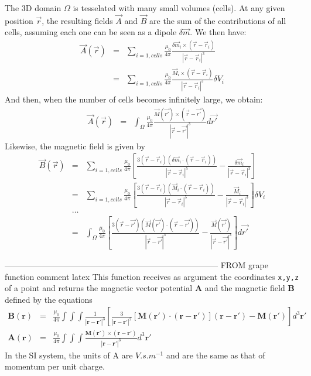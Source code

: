 The 3D domain $\Omega$ is tesselated with many small volumes (cells).
At any given position $\vec r$, the resulting fields $\vec A$ and $\vec B$
are the sum of the contributions of all cells, assuming each one
can be seen as a dipole $\delta \vec m$.
We then have:
\begin{eqnarray}
\vec A(\vec r) 
&=&  \sum_{i=1,cells} \frac{\mu_0}{4 \pi} \frac{ \delta \vec m_i \times (\vec r- \vec r_{i})}{|\vec r-\vec r_{i}|^3} \\
&=&  \sum_{i=1,cells} \frac{\mu_0}{4 \pi} \frac{ \vec M_i \times (\vec r- \vec r_{i})}{|\vec r-\vec r_{i}|^3} \delta V_i 
\end{eqnarray}
And then, when the number of cells becomes infinitely large, we obtain:
\begin{eqnarray}
\vec A(\vec r) 
&=&  \int_\Omega \frac{\mu_0}{4 \pi} \frac{ \vec M(\vec {r'}) \times (\vec r- \vec {r'})}{|\vec r-\vec{r'}|^3} d\vec{r'} 
\end{eqnarray}
Likewise, the magnetic field is given by 
\begin{eqnarray}
\vec B (\vec r) 
&=& \sum_{i=1,cells} \frac{\mu_0}{4\pi} 
\left[  \frac{3 (\vec r-\vec r_i) (\delta \vec m_i \cdot (\vec r-\vec r_i))}{|\vec r -\vec{r}_i|^5} - \frac{\delta \vec m_i}{|\vec r -\vec{r}_i|^3}  \right] \\
&=& \sum_{i=1,cells} \frac{\mu_0}{4\pi} 
\left[  \frac{3 (\vec r-\vec r_i) (\vec M_i \cdot (\vec r-\vec r_i))}{|\vec r -\vec{r}_i|^5} - \frac{\vec M_i}{|\vec r -\vec{r}_i|^3}  \right] \delta V_i \\
&\dots& \nonumber\\
&=& \int_\Omega \frac{\mu_0}{4\pi} 
\left[ \frac{3 (\vec r-\vec {r'}) (\vec M(\vec {r'}) \cdot (\vec r-\vec{r'}))}{|\vec r -\vec{r'}|^5} - \frac{\vec M(\vec{r'})}{|\vec r -\vec{r'}|^3} \right] d\vec{r'} 
\end{eqnarray}






------------------------------------------------------------------------------
FROM grape function comment latex
This function receives as argument the coordinates {\tt x,y,z} of a point and 
returns the magnetic vector potential ${\bm A}$ and the magnetic field ${\bm B}$
defined by the equations
\begin{eqnarray}
{\bm B}({\bm r}) &=& \frac{\mu_0}{4\pi} \int\int\int \frac{1}{|{\bm r}-{\bm r}'|^3}
\left[
\frac{3}{|{\bm r}-{\bm r}'|^2} [{\bm M}({\bm r}')\cdot({\bm r}-{\bm r}')]({\bm r}-{\bm r}') - {\bm M}({\bm r}')
\right]
d^3{\bm r}' \\
{\bm A}({\bm r}) &=& 
\frac{\mu_0}{4\pi} \int\int\int \frac{{\bm M}({\bm r}') \times ({\bm r}-{\bm r}')}{|{\bm r}-{\bm r}'|^3}
d^3{\bm r}'
\end{eqnarray}
In the SI system, the units of A are $V.s.m^{-1}$ 
and are the same as that of momentum per unit charge.

